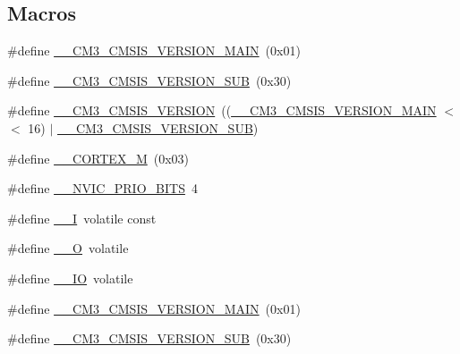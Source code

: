 \subsection*{Macros}
\begin{DoxyCompactItemize}
\item 
\#define \hyperlink{group___c_m_s_i_s___c_m3__core__definitions_gac1c1120e9fe082fac8225c60143ac79a}{\+\_\+\+\_\+\+C\+M3\+\_\+\+C\+M\+S\+I\+S\+\_\+\+V\+E\+R\+S\+I\+O\+N\+\_\+\+M\+A\+IN}~(0x01)
\item 
\#define \hyperlink{group___c_m_s_i_s___c_m3__core__definitions_ga9ff7a998d4b8b3c87bfaca6e78607950}{\+\_\+\+\_\+\+C\+M3\+\_\+\+C\+M\+S\+I\+S\+\_\+\+V\+E\+R\+S\+I\+O\+N\+\_\+\+S\+UB}~(0x30)
\item 
\#define \hyperlink{group___c_m_s_i_s___c_m3__core__definitions_gaf888c651cd8c93fd25364f9e74306a1c}{\+\_\+\+\_\+\+C\+M3\+\_\+\+C\+M\+S\+I\+S\+\_\+\+V\+E\+R\+S\+I\+ON}~((\hyperlink{group___c_m_s_i_s___c_m3__core__definitions_gac1c1120e9fe082fac8225c60143ac79a}{\+\_\+\+\_\+\+C\+M3\+\_\+\+C\+M\+S\+I\+S\+\_\+\+V\+E\+R\+S\+I\+O\+N\+\_\+\+M\+A\+IN} $<$$<$ 16) $\vert$ \hyperlink{group___c_m_s_i_s___c_m3__core__definitions_ga9ff7a998d4b8b3c87bfaca6e78607950}{\+\_\+\+\_\+\+C\+M3\+\_\+\+C\+M\+S\+I\+S\+\_\+\+V\+E\+R\+S\+I\+O\+N\+\_\+\+S\+UB})
\item 
\#define \hyperlink{group___c_m_s_i_s___c_m3__core__definitions_ga63ea62503c88acab19fcf3d5743009e3}{\+\_\+\+\_\+\+C\+O\+R\+T\+E\+X\+\_\+M}~(0x03)
\item 
\#define \hyperlink{group___c_m_s_i_s___c_m3__core__definitions_gae3fe3587d5100c787e02102ce3944460}{\+\_\+\+\_\+\+N\+V\+I\+C\+\_\+\+P\+R\+I\+O\+\_\+\+B\+I\+TS}~4
\item 
\#define \hyperlink{group___c_m_s_i_s___c_m3__core__definitions_gaf63697ed9952cc71e1225efe205f6cd3}{\+\_\+\+\_\+I}~volatile const
\item 
\#define \hyperlink{group___c_m_s_i_s___c_m3__core__definitions_ga7e25d9380f9ef903923964322e71f2f6}{\+\_\+\+\_\+O}~volatile
\item 
\#define \hyperlink{group___c_m_s_i_s___c_m3__core__definitions_gaec43007d9998a0a0e01faede4133d6be}{\+\_\+\+\_\+\+IO}~volatile
\item 
\#define \hyperlink{group___c_m_s_i_s___c_m3__core__definitions_gac1c1120e9fe082fac8225c60143ac79a}{\+\_\+\+\_\+\+C\+M3\+\_\+\+C\+M\+S\+I\+S\+\_\+\+V\+E\+R\+S\+I\+O\+N\+\_\+\+M\+A\+IN}~(0x01)
\item 
\#define \hyperlink{group___c_m_s_i_s___c_m3__core__definitions_ga9ff7a998d4b8b3c87bfaca6e78607950}{\+\_\+\+\_\+\+C\+M3\+\_\+\+C\+M\+S\+I\+S\+\_\+\+V\+E\+R\+S\+I\+O\+N\+\_\+\+S\+UB}~(0x30)
$$
\end{DoxyCompactItemize}

